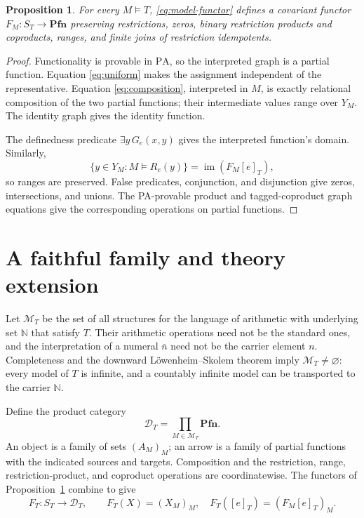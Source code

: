\documentclass[11pt]{article}
\newtheorem{proposition}[theorem]{Proposition}
\newcommand{\N}{\mathbb N}
\newcommand{\PA}{\mathrm{PA}}
\newcommand{\Pfn}{\mathbf{Pfn}}
\begin{document}
\begin{proposition}\label{prop:model}
For every $M\models T$, \eqref{eq:model-functor} defines a covariant
functor $F_M:S_T\to\Pfn$ preserving restrictions, zeros, binary
restriction products and coproducts, ranges, and finite joins of
restriction idempotents.
\end{proposition}
\begin{proof}
Functionality is provable in $\PA$, so the interpreted graph is a
partial function. Equation \eqref{eq:uniform} makes the assignment
independent of the representative. Equation \eqref{eq:composition},
interpreted in $M$, is exactly relational composition of the two partial
functions; their intermediate values range over $Y_M$. The identity
graph gives the identity function.

The definedness predicate $\exists y\,G_e(x,y)$ gives the interpreted
function's domain. Similarly,
\[
 \{y\in Y_M:M\models R_e(y)\}
 =\operatorname{im}(F_M[e]_T),
\]
so ranges are preserved. False predicates, conjunction, and disjunction
give zeros, intersections, and unions. The PA-provable product and
tagged-coproduct graph equations give the corresponding operations on
partial functions.
\end{proof}

\section{A faithful family and theory extension}\label{sec:family}

Let $\mathcal M_T$ be the set of all structures for the language of
arithmetic with underlying set $\N$ that satisfy $T$. Their arithmetic
operations need not be the standard ones, and the interpretation of a
numeral $\bar n$ need not be the carrier element $n$. Completeness and
the downward L\"owenheim--Skolem theorem imply
$\mathcal M_T\ne\varnothing$: every model of $T$ is infinite, and a
countably infinite model can be transported to the carrier $\N$.

Define the product category
\[
 \mathcal D_T=\prod_{M\in\mathcal M_T}\Pfn.
\]
An object is a family of sets $(A_M)_M$; an arrow is a family of partial
functions with the indicated sources and targets. Composition and the
restriction, range, restriction-product, and coproduct operations are coordinatewise.
The functors of Proposition~\ref{prop:model} combine to give
\[
 F_T:S_T\longrightarrow\mathcal D_T,\qquad
 F_T(X)=(X_M)_M,\quad F_T([e]_T)=(F_M[e]_T)_M.
\]
\end{document}
